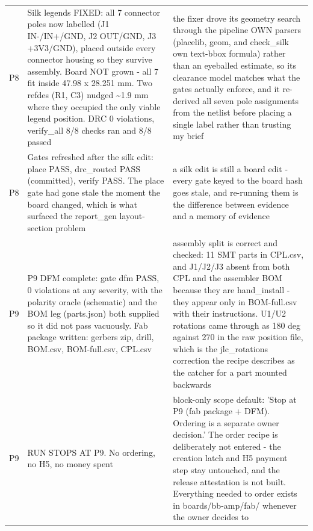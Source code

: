 \documentclass[11pt,a4paper]{article}
\begin{document}
{\begin{longtable}{lp{5.2cm}p{7.2cm}}
P8 & Silk legends FIXED: all 7 connector poles now labelled (J1 IN-/IN+/GND, J2 OUT/GND, J3 +3V3/GND), placed outside every connector housing so they survive assembly. Board NOT grown - all 7 fit inside 47.98 x 28.251 mm. Two refdes (R1, C3) nudged \textasciitilde{}1.9 mm where they occupied the only viable legend position. DRC 0 violations, verify\_all 8/8 checks ran and 8/8 passed & the fixer drove its geometry search through the pipeline OWN parsers (placelib, geom, and check\_silk own text-bbox formula) rather than an eyeballed estimate, so its clearance model matches what the gates actually enforce, and it re-derived all seven pole assignments from the netlist before placing a single label rather than trusting my brief \\
P8 & Gates refreshed after the silk edit: place PASS, drc\_routed PASS (committed), verify PASS. The place gate had gone stale the moment the board changed, which is what surfaced the report\_gen layout-section problem & a silk edit is still a board edit - every gate keyed to the board hash goes stale, and re-running them is the difference between evidence and a memory of evidence \\
P9 & P9 DFM complete: gate dfm PASS, 0 violations at any severity, with the polarity oracle (schematic) and the BOM leg (parts.json) both supplied so it did not pass vacuously. Fab package written: gerbers zip, drill, BOM.csv, BOM-full.csv, CPL.csv & assembly split is correct and checked: 11 SMT parts in CPL.csv, and J1/J2/J3 absent from both CPL and the assembler BOM because they are hand\_install - they appear only in BOM-full.csv with their instructions. U1/U2 rotations came through as 180 deg against 270 in the raw position file, which is the jlc\_rotations correction the recipe describes as the catcher for a part mounted backwards \\
P9 & RUN STOPS AT P9. No ordering, no H5, no money spent & block-only scope default: 'Stop at P9 (fab package + DFM). Ordering is a separate owner decision.' The order recipe is deliberately not entered - the creation latch and H5 payment step stay untouched, and the release attestation is not built. Everything needed to order exists in boards/bb-amp/fab/ whenever the owner decides to \\

\end{longtable}}
\end{document}
